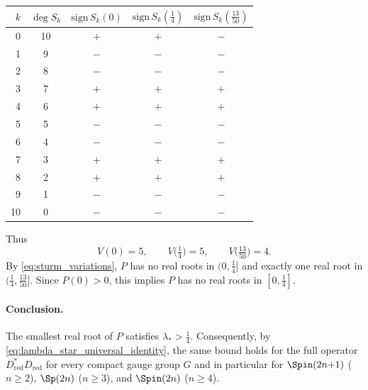 \begin{center}
\begin{tabular}{rcccc}
\toprule
$k$ & $\deg S_k$ & $\mathrm{sign}\,S_k(0)$ & $\mathrm{sign}\,S_k(\tfrac14)$ & $\mathrm{sign}\,S_k(\tfrac{13}{50})$ \\
\midrule
0  & 10 & $+$ & $+$ & $-$ \\
1  & 9  & $-$ & $-$ & $-$ \\
2  & 8  & $-$ & $-$ & $-$ \\
3  & 7  & $+$ & $+$ & $+$ \\
4  & 6  & $+$ & $+$ & $+$ \\
5  & 5  & $-$ & $-$ & $-$ \\
6  & 4  & $-$ & $-$ & $-$ \\
7  & 3  & $+$ & $+$ & $+$ \\
8  & 2  & $+$ & $+$ & $+$ \\
9  & 1  & $-$ & $-$ & $-$ \\
10 & 0  & $-$ & $-$ & $-$ \\
\bottomrule
\end{tabular}
\end{center}
Thus
\[
V(0)=5,\qquad V\bigl(\tfrac14\bigr)=5,\qquad V\bigl(\tfrac{13}{50}\bigr)=4.
\]
By \eqref{eq:sturm_variations}, $P$ has no real roots in $(0,\tfrac14]$ and exactly one real root in $(\tfrac14,\tfrac{13}{50}]$.
Since $P(0)>0$, this implies $P$ has no real roots in $[0,\tfrac14]$.

\paragraph{Conclusion.}\label{concl:lambda_star_gt_quarter}
The smallest real root of $P$ satisfies $\lambda_\ast>\tfrac14$.
Consequently, by \eqref{eq:lambda_star_universal_identity}, the same bound holds for the full operator $D_{\mathrm{red}}^{\ast}D_{\mathrm{red}}$
for every compact gauge group $G$ and in particular for $\Spin(2n{+}1)$ ($n\ge2$), $\Sp(2n)$ ($n\ge3$), and $\Spin(2n)$ ($n\ge4$).
